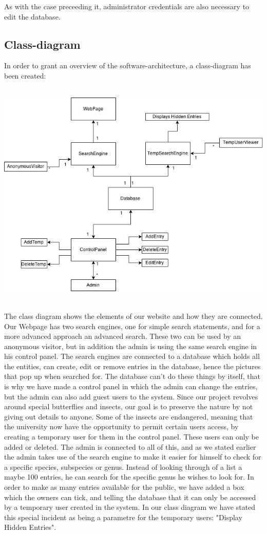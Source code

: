 \documentclass[12pt,a4paper]{article}
\begin{document}
As with the case preceeding it, administrator credentials are also necessary to edit the database.
\newpage

\subsection{Class-diagram}

In order to grant an overview of the software-architecture, a class-diagram has been created:

\includegraphics[height=110mm]{ClassDiagram.png}

The class diagram shows the elements of our website and how they are connected. Our Webpage has two search engines, one for simple search statements, and for a more advanced approach an advanced search. These two can be used by an anonymous visitor, but in addition the admin is using the same search engine in his control panel. The search engines are connected to a database which holds all the entities, can create, edit or remove entries in the database, hence the pictures that pop up when searched for. The database can't do these things by itself, that is why we have made a control panel in which the admin can change the entries, but the admin can also add guest users to the system. Since our project revolves around special butterflies and insects, our goal is to preserve the nature by not giving out details to anyone. Some of the insects are endangered, meaning that the university now have the opportunity to permit certain users access, by creating a temporary user for them in the control panel. These users can only be added or deleted. The admin is connected to all of this, and as we stated earlier the admin takes use of the search engine to make it easier for himself to check for a specific species, subspecies or genus. Instead of looking through of a list a maybe 100 entries, he can search for the specific genus he wishes to look for. In order to make as many entries available for the public, we have added a box which the owners can tick, and telling the database that it can only be accessed by a temporary user created in the system. In our class diagram we have stated this special incident as being a parametre for the temporary users: "Display Hidden Entries".
\newpage
\end{document}
